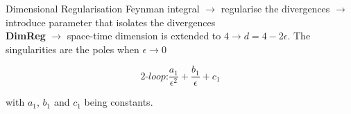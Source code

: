 \documentclass[11pt]{beamer}
\begin{document}
\begin{frame}{Dimensional Regularisation}
Feynman integral $\longrightarrow$ regularise the divergences $\longrightarrow$ introduce parameter that isolates the divergences 
\\
\vspace{.5cm}
\textbf{DimReg} $\longrightarrow$ space-time dimension is extended to $ 4 \longrightarrow d=4-2\epsilon$. The singularities are the poles when $\epsilon \longrightarrow 0$ 

\begin{equation}
    \textit{2-loop:} \frac{a_1}{\epsilon^2} + \frac{b_1}{\epsilon} + c_1
\end{equation}

with $a_1$, $b_1$ and $c_1$ being constants.\\
\vspace{.1 cm}
\end{frame}
\end{document}
